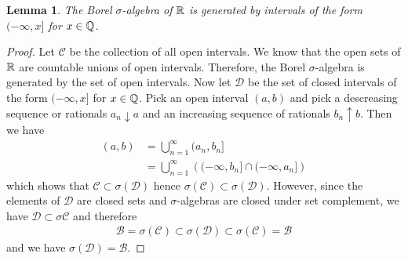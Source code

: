 \documentclass{amsart}
\newtheorem{lem}[thm]{Lemma}
\theoremstyle{remark}
\theoremstyle{definition}
\begin{document}
\begin{lem}\label{IntervalsGenerateBorel}The Borel $\sigma$-algebra of $\mathbb{R}$ is generated by intervals
  of the form $(-\infty, x]$ for $x \in \mathbb{Q}$.
\end{lem}
\begin{proof}Let $\mathcal{C}$ be the collection of all open
  intervals.
We know that the open sets of $\mathbb{R}$ are countable
  unions of open intervals.  Therefore, the Borel $\sigma$-algebra is
  generated by the set of open intervals.  Now let $\mathcal{D}$ be
  the set of closed intervals of the form $(-\infty,x]$ for $x \in
  \mathbb{Q}$.  Pick an open interval
  $(a,b)$ and pick a descreasing sequence or rationals $a_n \downarrow
  a$ and an increasing sequence of rationals $b_n \uparrow b$.  Then
  we have 
\begin{align*}(a,b) &= \bigcup_{n=1}^\infty (a_n,b_n] \\
&= \bigcup_{n=1}^\infty \left ( (-\infty,b_n] \cap (-\infty,a_n] \right )
\end{align*}
which shows that $\mathcal{C} \subset \sigma(\mathcal{D})$ hence 
$\sigma(\mathcal{C}) \subset \sigma(\mathcal{D})$.  However, since the
elements of $\mathcal{D}$ are closed sets and $\sigma$-algebras are
closed under set complement, we have $\mathcal{D} \subset
\sigma{\mathcal{C}}$ and therefore
\begin{align*}
\mathcal{B} = \sigma(\mathcal{C}) \subset \sigma(\mathcal{D}) \subset
\sigma(\mathcal{C}) = \mathcal{B}
\end{align*}
and we have $\sigma(\mathcal{D}) = \mathcal{B}$.
\end{proof}
\end{document}

